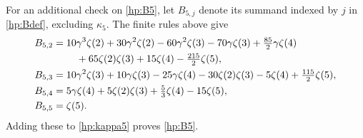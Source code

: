 For an additional check on \eqref{hp:B5}, let $B_{5,j}$ denote its
summand indexed by $j$ in \eqref{hp:Bdef}, excluding $\kappa_5$.
The finite rules above give
\begin{align}\label{hp:Bpieces}
 B_{5,2}={}&10\gamma^3\zeta(2)+30\gamma^2\zeta(2)
 -60\gamma^2\zeta(3)-70\gamma\zeta(3)+\tfrac{85}{2}\gamma\zeta(4)
 \notag\\
 &\quad+65\zeta(2)\zeta(3)+15\zeta(4)-\tfrac{215}{2}\zeta(5),\notag\\
 B_{5,3}={}&10\gamma^2\zeta(3)+10\gamma\zeta(3)-25\gamma\zeta(4)
       -30\zeta(2)\zeta(3)-5\zeta(4)+\tfrac{115}{2}\zeta(5),\notag\\
 B_{5,4}={}&5\gamma\zeta(4)+5\zeta(2)\zeta(3)
                            +\tfrac53\zeta(4)-15\zeta(5),\notag\\
 B_{5,5}={}&\zeta(5).
\end{align}
Adding these to \eqref{hp:kappa5} proves \eqref{hp:B5}.

